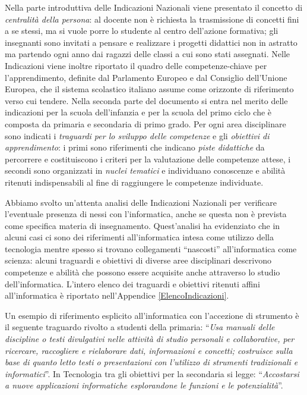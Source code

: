 \documentclass[12pt]{report}
\begin{document}
Nella parte introduttiva delle Indicazioni Nazionali viene presentato il concetto di \textit{centralità della persona}: al docente non è richiesta la trasmissione di concetti fini a se stessi, ma si vuole porre lo studente al centro dell'azione formativa; gli insegnanti sono invitati a pensare e realizzare i progetti didattici non in astratto ma partendo ogni anno dai ragazzi delle classi a cui sono stati assegnati.
Nelle Indicazioni viene inoltre riportato il quadro delle competenze-chiave per l’apprendimento, definite dal Parlamento Europeo e dal Consiglio dell'Unione Europea, che il sistema scolastico italiano assume come orizzonte di riferimento verso cui tendere.
Nella seconda parte del documento si entra nel merito delle indicazioni per la scuola dell'infanzia e per la scuola del primo ciclo che è composta da primaria e secondaria di primo grado.
Per ogni area disciplinare sono indicati i \textit{traguardi per lo sviluppo delle competenze} e gli \textit{obiettivi di apprendimento}: i primi sono riferimenti che indicano \textit{piste didattiche} da percorrere e costituiscono i criteri per la valutazione delle competenze attese, i secondi sono organizzati in \textit{nuclei tematici} e individuano conoscenze e abilità ritenuti indispensabili al fine di raggiungere le competenze individuate.

Abbiamo svolto un'attenta analisi delle Indicazioni Nazionali per verificare l'eventuale presenza di nessi con l'informatica, anche se questa non è prevista come specifica materia di insegnamento.
Quest'analisi ha evidenziato che in alcuni casi ci sono dei riferimenti all'informatica intesa come utilizzo della tecnologia mentre spesso si trovano collegamenti ``nascosti'' all'informatica come scienza: alcuni traguardi e obiettivi di diverse aree disciplinari descrivono competenze e abilità che possono essere acquisite anche attraverso lo studio dell'informatica.
L'intero elenco dei traguardi e obiettivi ritenuti affini all'informatica è riportato nell'Appendice \ref{ElencoIndicazioni}.

Un esempio di riferimento esplicito all'informatica con l'accezione di strumento è il seguente traguardo rivolto a studenti della primaria: ``\textit{Usa manuali delle discipline o testi divulgativi nelle attività di studio personali e collaborative, per ricercare, raccogliere e rielaborare dati, informazioni e concetti; costruisce sulla base di quanto letto testi o presentazioni con l’utilizzo di strumenti tradizionali e informatici}''. In Tecnologia tra gli obiettivi per la secondaria si legge: ``\textit{Accostarsi a nuove applicazioni informatiche esplorandone le funzioni e le potenzialità}''.
\end{document}
